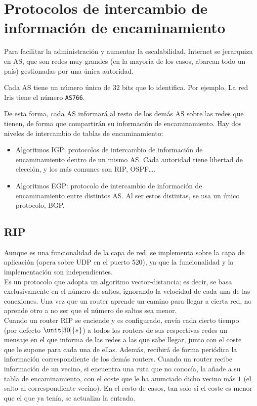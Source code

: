 \section{Protocolos de intercambio de información de encaminamiento}

Para facilitar la administración y aumentar la escalabilidad, Internet se jerarquiza en \acrfull{AS}, que son redes muy grandes (en la mayoría de los casos, abarcan todo un país) gestionadas por una única autoridad.
\begin{observacion}
Cada \acrshort{AS} tiene un número único de $32$ bits que lo identifica. Por ejemplo, La red Iris tiene el número \verb|AS766|.
\end{observacion}

De esta forma, cada \acrshort{AS} informará al resto de los demás \acrshort{AS} sobre las redes que tienen, de forma que compartirán su información de encaminamiento. Hay dos niveles de intercambio de tablas de encaminamiento:
\begin{itemize}
    \item Algoritmos \acrfull{IGP}: protocolos de intercambio de información de encaminamiento dentro de un mismo \acrshort{AS}. Cada autoridad tiene libertad de elección, y los más comunes son \acrshort{RIP}, \acrshort{OSPF}\ldots.

    \item Algoritmos \acrfull{EGP}: protocolo de intercambio de información de encaminamiento entre distintos \acrshort{AS}. Al ser estos distintas, se usa un único protocolo, \acrshort{BGP}.
\end{itemize}

\subsection{\acrfull{RIP}}

Aunque es una funcionalidad de la capa de red, se implementa sobre la capa de aplicación (opera sobre \acrshort{UDP} en el puerto 520), ya que la funcionalidad y la implementación son independientes.\\

Es un protocolo que adopta un algoritmo vector-distancia; es decir, se basa exclusivamente en el número de saltos, ignorando la velocidad de cada una de las conexiones. Una vez que un router aprende un camino para llegar a cierta red, no aprende otro a no ser que el número de saltos sea menor.\\

Cuando un router RIP se enciende y es configurado, envía cada cierto tiempo (por defecto $\unit[30]{s}$) a todos los routers de sus respectivas redes un mensaje en el que informa de las redes a las que sabe llegar, junto con el coste que le supone para cada una de ellas. Además, recibirá de forma periódica la información correspondiente de los demás routers. Cuando un router recibe información de un vecino, si encuentra una ruta que no conocía, la añade a su tabla de encaminamiento, con el coste que le ha anunciado dicho vecino más $1$ (el salto al correspondiente vecino). En el resto de casos, tan solo si el coste es menor que el que ya tenía, se actualiza la entrada.\\

